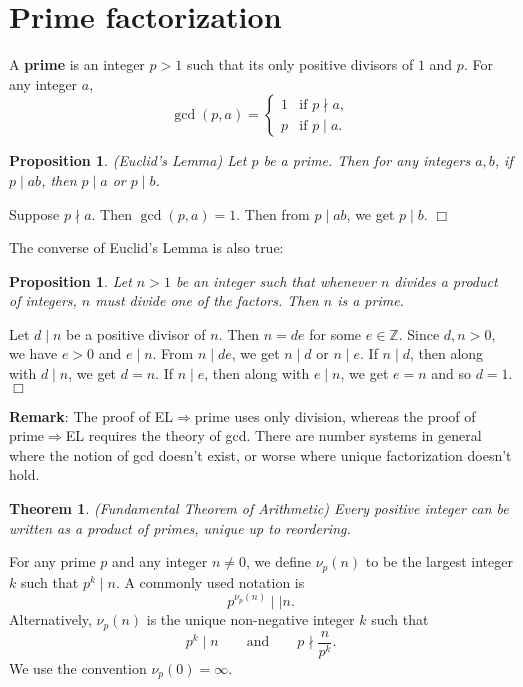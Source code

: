 \documentclass{article}
\def\Z{{\mathbb Z}}
\def\Z{{\mathbb Z}}
\newtheorem{theorem}[subsection]{Theorem}
\newtheorem{proposition}[subsection]{Proposition}
\newenvironment{proof}{\noindent {\bf Proof:}}{$\Box$ \vspace{2 ex}}
\begin{document}
\section{Prime factorization}
A \textbf{prime} is an integer $p>1$ such that its only positive divisors of $1$ and $p$. For any integer $a$,
$$\gcd(p,a) = \begin{cases}1&\mbox{if }p\nmid a,\\ p&\mbox{if }p\mid a.\end{cases}$$

\begin{proposition}
    (Euclid's Lemma) Let $p$ be a prime. Then for any integers $a,b$, if $p\mid ab$, then $p\mid a$ or $p\mid b$.
\end{proposition}

\begin{proof}
    Suppose $p\nmid a$. Then $\gcd(p,a) = 1$. Then from $p\mid ab$, we get $p\mid b$.
\end{proof}

The converse of Euclid's Lemma is also true: 

\begin{proposition}
    Let $n>1$ be an integer such that whenever $n$ divides a product of integers, $n$ must divide one of the factors. Then $n$ is a prime.
\end{proposition}

\begin{proof}
    Let $d\mid n$ be a positive divisor of $n$. Then $n = de$ for some $e\in\Z$. Since $d,n>0$, we have $e>0$ and $e\mid n$. From $n\mid de$, we get $n\mid d$ or $n\mid e$. If $n\mid d$, then along with $d\mid n$, we get $d = n$. If $n\mid e$, then along with $e\mid n$, we get $e = n$ and so $d = 1$.
\end{proof}

\noindent\textbf{Remark}: The proof of EL$\Rightarrow$prime uses only division, whereas the proof of prime$\Rightarrow$EL requires the theory of gcd. There are number systems in general where the notion of gcd doesn't exist, or worse where unique factorization doesn't hold.

\begin{theorem}
(Fundamental Theorem of Arithmetic) Every positive integer can be written as a product of primes, unique up to reordering.
\end{theorem}

For any prime $p$ and any integer $n\neq 0$, we define $\nu_p(n)$ to be the largest integer $k$ such that $p^k\mid n$. A commonly used notation is
$$p^{\nu_p(n)} \mid\mid n.$$
Alternatively, $\nu_p(n)$ is the unique non-negative integer $k$ such that
$$p^k\mid n\qquad\mbox{and}\qquad p\nmid\frac{n}{p^k}.$$
We use the convention $\nu_p(0) = \infty$.
\end{document}
